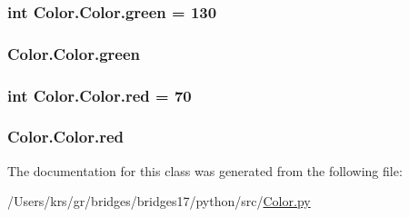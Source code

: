 \subsubsection[{green}]{\setlength{\rightskip}{0pt plus 5cm}int Color.\+Color.\+green = 130\hspace{0.3cm}{\ttfamily [static]}}\label{class_color_1_1_color_a2558fb658f57fba3743dea819964779f}
\hypertarget{class_color_1_1_color_a608f39a75b991c1ffda8bd91d9744d2b}{}
\subsubsection[{green}]{\setlength{\rightskip}{0pt plus 5cm}Color.\+Color.\+green}\label{class_color_1_1_color_a608f39a75b991c1ffda8bd91d9744d2b}
\hypertarget{class_color_1_1_color_aa562dd16015338e561218c44ca7b9db7}{}
\subsubsection[{red}]{\setlength{\rightskip}{0pt plus 5cm}int Color.\+Color.\+red = 70\hspace{0.3cm}{\ttfamily [static]}}\label{class_color_1_1_color_aa562dd16015338e561218c44ca7b9db7}
\hypertarget{class_color_1_1_color_ad6b9578f975c4f066a1e34dff6ac557a}{}
\subsubsection[{red}]{\setlength{\rightskip}{0pt plus 5cm}Color.\+Color.\+red}\label{class_color_1_1_color_ad6b9578f975c4f066a1e34dff6ac557a}


The documentation for this class was generated from the following file\+:\begin{DoxyCompactItemize}
\item 
/\+Users/krs/gr/bridges/bridges17/python/src/\hyperlink{_color_8py}{Color.\+py}\end{DoxyCompactItemize}
